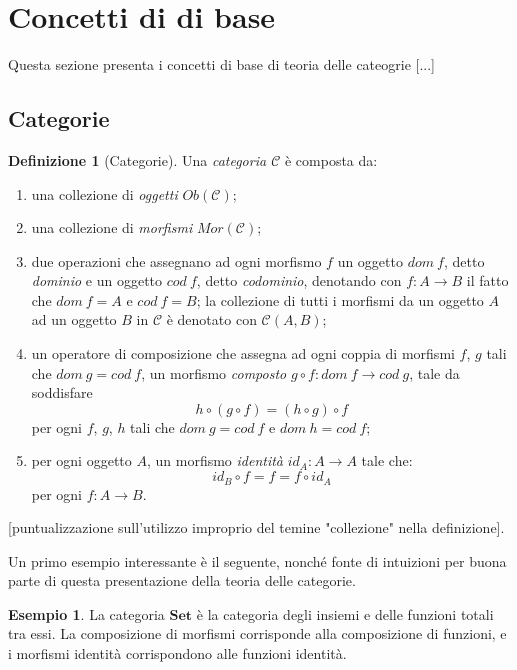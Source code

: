 \documentclass{article}
\theoremstyle{plain}
\theoremstyle{definition}
\newtheorem{definition}[theorem]{Definizione}
\newtheorem{example}[theorem]{Esempio}
\newcommand{\id}[1]{id_{#1}}
\begin{document}
\section{Concetti di di base}

Questa sezione presenta i concetti di base di teoria delle cateogrie [...] 

\subsection{Categorie}

	\begin{definition}[Categorie]
		Una \emph{categoria $\mathcal{C}$} è composta da:
		\begin{enumerate}
			\item una collezione di \emph{oggetti} $Ob(\mathcal{C})$;
			\item una collezione di \emph{morfismi} $Mor(\mathcal{C})$;
			\item due operazioni che assegnano ad ogni morfismo $f$ un oggetto $dom\ f$, detto \emph{dominio} e un oggetto $cod\ f$, detto \emph{codominio}, denotando con $f: A \rightarrow B$ il fatto che $dom\ f = A \text{ e } cod\ f = B$; la collezione di tutti i morfismi da un oggetto $A$ ad un oggetto $B$ in $\mathcal{C}$ è denotato con $\mathcal{C}(A, B)$;
			\item un operatore di composizione che assegna ad ogni coppia di morfismi $f$, $g$ tali che $dom\ g = cod\ f$, un morfismo \emph{composto} $g \circ f: dom\ f \rightarrow cod\ g$, tale da soddisfare
				\[
					h \circ (g \circ f) = (h \circ g) \circ f
				\]
				per ogni $f$, $g$, $h$ tali che $dom\ g = cod\ f \text{ e } dom\ h = cod\ f$;
			\item per ogni oggetto $A$, un morfismo \emph{identità} $\id{A}: A \rightarrow A$ tale che:
				\[
					\id{B} \circ f = f = f \circ \id{A}
				\]
				per ogni $f: A \rightarrow B$.
		\end{enumerate}
	\end{definition}

	[puntualizzazione sull'utilizzo improprio del temine "collezione" nella definizione].
	
	Un primo esempio interessante è il seguente, nonché fonte di intuizioni per buona parte di questa presentazione della teoria delle categorie.

	\begin{example}
		La categoria $\textbf{Set}$ è la categoria degli insiemi e delle funzioni totali tra essi. La composizione di morfismi corrisponde alla composizione di funzioni, e i morfismi identità corrispondono alle funzioni identità.
	\end{example}
\end{document}
